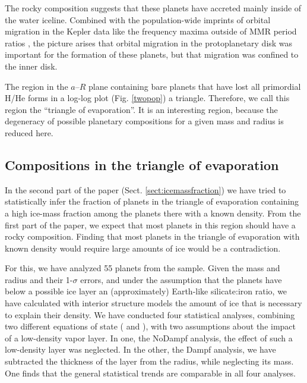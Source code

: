 \documentclass[]{emulateapj}
\begin{document}
The rocky composition suggests that these planets have accreted mainly inside of the water iceline. Combined with the population-wide imprints of  orbital migration in the Kepler data like the frequency maxima outside of MMR period ratios \citep{Fabrycky2014}, the picture arises that orbital migration in the protoplanetary disk was important for the formation of these planets, but that  migration was confined to the inner disk. 

The region in the $a$--$R$ plane containing bare planets that have lost all primordial H/He forms in a log-log plot (Fig. \ref{twopop}) a triangle. Therefore, we call this region the ``triangle of evaporation''. It is an interesting region, because the degeneracy of possible planetary compositions for a given mass and radius is reduced here. 

\subsection{{Compositions in the triangle of evaporation}}
In the second part of the paper (Sect. \ref{sect:icemassfraction}) we have tried to statistically infer the fraction of planets in the triangle of evaporation containing a high ice-mass fraction among the planets there with a known density. From the first part of the paper, we expect that most planets in this region should have a rocky composition. Finding that most planets in the triangle of evaporation with known density would require large amounts of ice would  be a contradiction. 

For this, we have analyzed 55 planets from the \citet{WeissMarcy2014} sample. Given the mass and radius and their 1-$\sigma$ errors, and under the assumption that the planets have below a possible ice layer an (approximately) Earth-like silicate:iron ratio, we have calculated with interior structure models \citep{Mordasini2012b} the amount of ice that is necessary to explain their density. We have conducted four statistical analyses, combining two different equations of state (\citealt{Seager2007} and \citealt{Grasset2009}), with two assumptions about the impact of a low-density vapor layer. In one, the NoDampf analysis, the effect of such a low-density layer {was} neglected. In the other, the Dampf analysis, we have subtracted the thickness of the layer from the radius, while neglecting its mass. One finds that the general statistical trends are comparable in all four analyses.  
\end{document}
